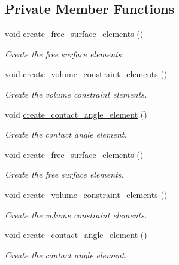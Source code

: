 \subsection*{Private Member Functions}
\begin{DoxyCompactItemize}
\item 
void \hyperlink{classPseudoSolidCapProblem_ac0219ed64385dc20c4fc3c6cc217fd67}{create\+\_\+free\+\_\+surface\+\_\+elements} ()
\begin{DoxyCompactList}\small\item\em Create the free surface elements. \end{DoxyCompactList}\item 
void \hyperlink{classPseudoSolidCapProblem_a0289801610e2bc864c67d4d8557d56b1}{create\+\_\+volume\+\_\+constraint\+\_\+elements} ()
\begin{DoxyCompactList}\small\item\em Create the volume constraint elements. \end{DoxyCompactList}\item 
void \hyperlink{classPseudoSolidCapProblem_a8f28ebf09bc66142725139291b4e21a0}{create\+\_\+contact\+\_\+angle\+\_\+element} ()
\begin{DoxyCompactList}\small\item\em Create the contact angle element. \end{DoxyCompactList}\item 
void \hyperlink{classPseudoSolidCapProblem_ac0219ed64385dc20c4fc3c6cc217fd67}{create\+\_\+free\+\_\+surface\+\_\+elements} ()
\begin{DoxyCompactList}\small\item\em Create the free surface elements. \end{DoxyCompactList}\item 
void \hyperlink{classPseudoSolidCapProblem_a0289801610e2bc864c67d4d8557d56b1}{create\+\_\+volume\+\_\+constraint\+\_\+elements} ()
\begin{DoxyCompactList}\small\item\em Create the volume constraint elements. \end{DoxyCompactList}\item 
void \hyperlink{classPseudoSolidCapProblem_a8f28ebf09bc66142725139291b4e21a0}{create\+\_\+contact\+\_\+angle\+\_\+element} ()
\begin{DoxyCompactList}\small\item\em Create the contact angle element. \end{DoxyCompactList}\end{DoxyCompactItemize}

